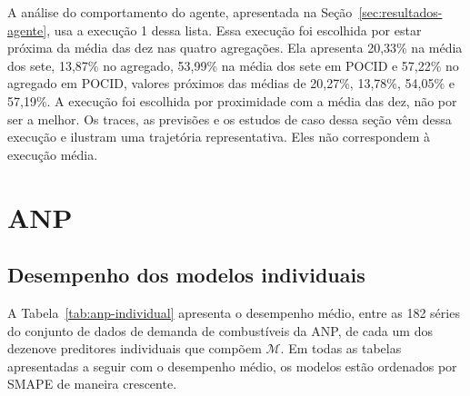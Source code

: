 A análise do comportamento do agente, apresentada na Seção~\ref{sec:resultados-agente}, usa a execução 1 dessa lista. Essa execução foi escolhida por estar próxima da média das dez nas quatro agregações. Ela apresenta 20,33\% na média dos sete, 13,87\% no agregado, 53,99\% na média dos sete em POCID e 57,22\% no agregado em POCID, valores próximos das médias de 20,27\%, 13,78\%, 54,05\% e 57,19\%. A execução foi escolhida por proximidade com a média das dez, não por ser a melhor. Os traces, as previsões e os estudos de caso dessa seção vêm dessa execução e ilustram uma trajetória representativa. Eles não correspondem à execução média.
\section{ANP} \label{sec:resultados-anp}

\subsection{Desempenho dos modelos individuais}

A Tabela~\ref{tab:anp-individual} apresenta o desempenho médio, entre as 182 séries do conjunto de dados de demanda de combustíveis da ANP, de cada um dos dezenove preditores individuais que compõem $\mathcal{M}$. Em todas as tabelas apresentadas a seguir com o desempenho médio, os modelos estão ordenados por SMAPE de maneira crescente.

